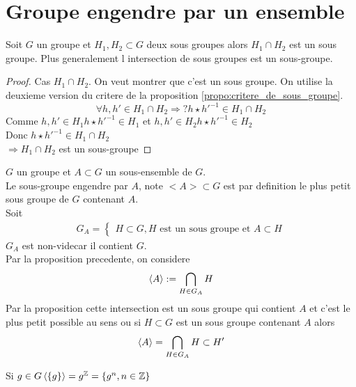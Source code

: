 \documentclass[../main.tex]{subfiles}
\begin{document}
\section{Groupe engendre par un ensemble}
\begin{propo}\label{propo:intersection_de_sous_groupes}
	Soit $G$ un groupe et $H_1, H_2 \subset G$ deux sous groupes alors $ H_1\cap H_2$ est un sous groupe.
	Plus generalement l intersection de sous groupes est un sous-groupe.
\end{propo}
\begin{proof}
Cas $ H_1 \cap H_2$.
On veut montrer que c'est un sous groupe. On utilise la deuxieme version du critere de la proposition \ref{propo:critere_de_sous_groupe}.
\[ 
\forall h,h' \in H_1\cap H_2 \Rightarrow ? h\star h'^{-1} \in H_1\cap H_2
\]
Comme $h,h' \in H_1 h\star h'^{-1}\in H_1$ et
$h,h' \in  H_2 h \star h'^{-1} \in H_2$\\
Donc $h\star h'^{-1}\in H_1 \cap H_2$\\
$  \Rightarrow H_1 \cap H_2$ est un sous-groupe
\end{proof}

\begin{defn}\label{defn:sous_groupe_engendre}
	$G$ un groupe et $A\subset G$ un sous-ensemble de $G$.\\
	Le sous-groupe engendre par $A$, note $<A> \subset G$ est par definition le plus petit sous groupe de $G$ contenant $A$.\\
	Soit
	\begin{align*}
	G_A =
	\begin{cases}
	H \subset G, H \text{ est un sous groupe et  } A \subset H
	\end{cases}
	\end{align*}
	$G_A$ est non-videcar il contient $G$.\\
	Par la proposition precedente, on considere
	\[ 
		\left\langle A\right\rangle := \bigcap_{H\in G_A} H
	\]
	Par la proposition cette intersection est un sous groupe qui contient $A$ et c'est le plus petit possible au sens ou si $H \subset G$ est un sous groupe contenant $A$ alors
	\[ 
		\left\langle A\right\rangle =\bigcap_{H \in G_A}H \subset H'
	\]
\end{defn}
\begin{exemple}
Si $g\in G \left\langle\{g\}\right\rangle = g ^{\mathbb{Z}} = \{g^{n}, n\in \mathbb{Z}\}$
\end{exemple}
\end{document}
